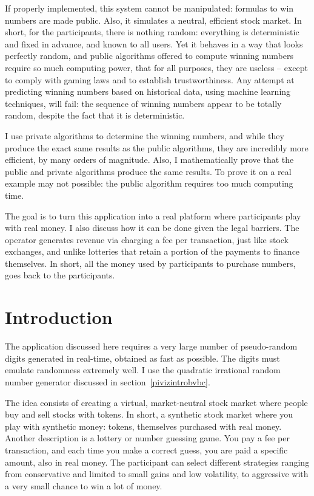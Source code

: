 \documentclass[oneside,10pt]{book}
\begin{document}
If properly implemented, this system  cannot be manipulated: formulas to win numbers  are made public. Also, it simulates a neutral, efficient stock market. In short, for the participants, there is nothing random: everything is deterministic and fixed in advance, and known to all users. Yet it behaves in a way that looks perfectly random, and public algorithms offered to compute winning numbers require so much computing power, that for all purposes, they are useless -- except to comply with gaming laws and to establish trustworthiness. Any attempt at predicting winning numbers based on historical data, using machine learning techniques, will fail: the sequence of winning numbers appear to be totally random, despite the fact that it is deterministic.

I use private algorithms to determine the winning numbers, and while they produce the exact same results as the public algorithms, they are incredibly more efficient, by many orders of magnitude. Also, I mathematically prove that the public and private algorithms produce the same results. To prove it on a real example may not possible: the public algorithm requires too much computing time.

The goal is to turn this application into a real platform where participants play with real money. I also discuss how it can be done given the legal barriers. The operator generates revenue via charging a fee per transaction, just like stock exchanges, and unlike lotteries that retain a portion of the payments to finance themselves. In short, all the money used by participants to purchase numbers, goes back to the participants.

\section{Introduction}

The application discussed here requires a very large number of pseudo-random digits generated in real-time, obtained as fast as possible. The digits must emulate randomness extremely well. I use the quadratic irrational random number
 generator discussed in section~\ref{pivizintrobvbc}.

The idea consists of creating a virtual, market-neutral stock market where people buy and sell stocks with tokens. In short, a synthetic stock market where you play with synthetic money: tokens, themselves purchased with real money. Another description is a lottery or number guessing game. You pay a fee per transaction, and each time you make a correct guess, you are paid a specific amount, also in real money. The participant can select different strategies ranging from conservative and limited to small gains and low volatility, to aggressive with a very small chance to win a lot of money.
\end{document}
